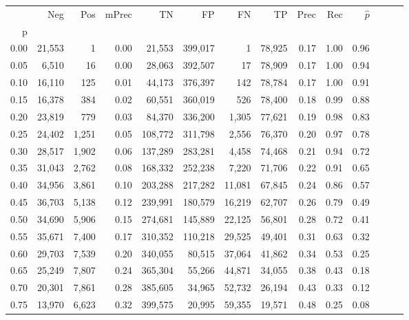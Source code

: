 \begin{tabular}{rrrrrrrrrrrrrr}
\toprule
{} &     Neg &    Pos & mPrec &       TN &       FP &      FN &      TP &  Prec &   Rec & $\hat{p}$ \\
p    &         &        &       &          &          &         &         &       &       &           \\
\midrule
0.00 &  21,553 &      1 &  0.00 &   21,553 &  399,017 &       1 &  78,925 &  0.17 &  1.00 &      0.96 \\
0.05 &   6,510 &     16 &  0.00 &   28,063 &  392,507 &      17 &  78,909 &  0.17 &  1.00 &      0.94 \\
0.10 &  16,110 &    125 &  0.01 &   44,173 &  376,397 &     142 &  78,784 &  0.17 &  1.00 &      0.91 \\
0.15 &  16,378 &    384 &  0.02 &   60,551 &  360,019 &     526 &  78,400 &  0.18 &  0.99 &      0.88 \\
0.20 &  23,819 &    779 &  0.03 &   84,370 &  336,200 &   1,305 &  77,621 &  0.19 &  0.98 &      0.83 \\
0.25 &  24,402 &  1,251 &  0.05 &  108,772 &  311,798 &   2,556 &  76,370 &  0.20 &  0.97 &      0.78 \\
0.30 &  28,517 &  1,902 &  0.06 &  137,289 &  283,281 &   4,458 &  74,468 &  0.21 &  0.94 &      0.72 \\
0.35 &  31,043 &  2,762 &  0.08 &  168,332 &  252,238 &   7,220 &  71,706 &  0.22 &  0.91 &      0.65 \\
0.40 &  34,956 &  3,861 &  0.10 &  203,288 &  217,282 &  11,081 &  67,845 &  0.24 &  0.86 &      0.57 \\
0.45 &  36,703 &  5,138 &  0.12 &  239,991 &  180,579 &  16,219 &  62,707 &  0.26 &  0.79 &      0.49 \\
0.50 &  34,690 &  5,906 &  0.15 &  274,681 &  145,889 &  22,125 &  56,801 &  0.28 &  0.72 &      0.41 \\
0.55 &  35,671 &  7,400 &  0.17 &  310,352 &  110,218 &  29,525 &  49,401 &  0.31 &  0.63 &      0.32 \\
0.60 &  29,703 &  7,539 &  0.20 &  340,055 &   80,515 &  37,064 &  41,862 &  0.34 &  0.53 &      0.25 \\
0.65 &  25,249 &  7,807 &  0.24 &  365,304 &   55,266 &  44,871 &  34,055 &  0.38 &  0.43 &      0.18 \\
0.70 &  20,301 &  7,861 &  0.28 &  385,605 &   34,965 &  52,732 &  26,194 &  0.43 &  0.33 &      0.12 \\
0.75 &  13,970 &  6,623 &  0.32 &  399,575 &   20,995 &  59,355 &  19,571 &  0.48 &  0.25 &      0.08 \\

\end{tabular}

